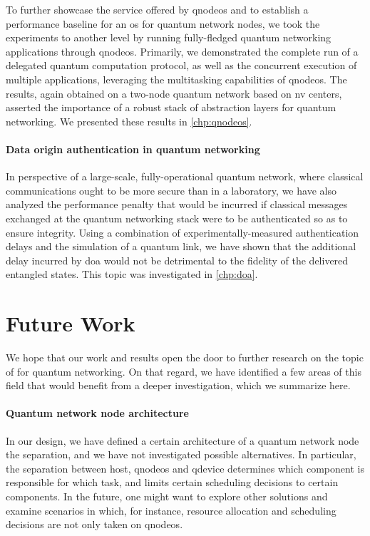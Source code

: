 To further showcase the service offered by \acrshort{qnodeos} and to establish a performance
baseline for an \acrshort{os} for quantum network nodes, we took the experiments to another level by
running fully-fledged quantum networking applications through \acrshort{qnodeos}. Primarily, we
demonstrated the complete run of a delegated quantum computation protocol, as well as the concurrent
execution of multiple applications, leveraging the multitasking capabilities of \acrshort{qnodeos}.
The results, again obtained on a two-node quantum network based on \acrlong{nv} centers, asserted
the importance of a robust stack of abstraction layers for quantum networking.  We presented these results in \cref{chp:qnodeos}.

\paragraph{Data origin authentication in quantum networking}

In perspective of a large-scale, fully-operational quantum network, where classical communications
ought to be more secure than in a laboratory, we have also analyzed the performance penalty that
would be incurred if classical messages exchanged at the quantum networking stack were to be
authenticated so as to ensure integrity. Using a combination of experimentally-measured
authentication delays and the simulation of a quantum link, we have shown that the additional delay
incurred by \acrlong{doa} would not be detrimental to the fidelity of the delivered entangled
states. This topic was investigated in \cref{chp:doa}.

\section{Future Work}

We hope that our work and results open the door to further research on the topic of 
for quantum networking. On that regard, we have identified a few areas of this field that would
benefit from a deeper investigation, which we summarize here.

\paragraph{Quantum network node architecture}

In our design, we have defined a certain architecture of a quantum network node the separation, and
we have not investigated possible alternatives. In particular, the separation between host,
\acrshort{qnodeos} and \acrshort{qdevice} determines which component is responsible for which task,
and limits certain scheduling decisions to certain components. In the future, one might want to
explore other solutions and examine scenarios in which, for instance, resource allocation and
scheduling decisions are not only taken on \acrshort{qnodeos}.

